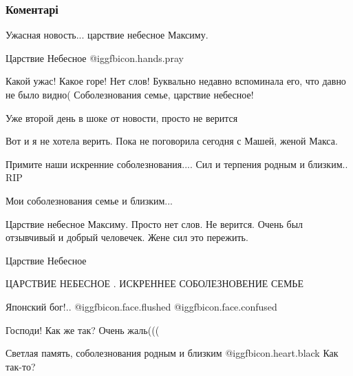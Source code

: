  
 
 
 
 
\subsubsection{Коментарі}
\label{sec:29_11_2021.fb.fb_group.vzaimovyruchka_doneck_dnr.1.maksim_sivuhin_smert.cmt}

\begin{itemize} %
Ужасная новость... царствие небесное Максиму.

Царствие Небесное  @igg{fbicon.hands.pray} 

Какой ужас! Какое горе! Нет слов!
Буквально недавно вспоминала его, что давно не было видно(
Соболезнования семье, царствие небесное!

Уже второй день в шоке от новости, просто не верится

Вот и я не хотела верить. Пока не поговорила сегодня с Машей, женой Макса.

Примите наши искренние соболезнования....
Сил и терпения родным и близким..
RIP

Мои соболезнования семье и близким...

Царствие небесное Максиму. Просто нет слов. Не верится. Очень был отзывчивый и добрый человечек. Жене сил это пережить.

Царствие Небесное

ЦАРСТВИЕ НЕБЕСНОЕ .
ИСКРЕННЕЕ СОБОЛЕЗНОВЕНИЕ СЕМЬЕ

Японский бог!..  @igg{fbicon.face.flushed}  @igg{fbicon.face.confused} 

Господи! Как же так? Очень жаль(((

Светлая память, соболезнования родным и близким  @igg{fbicon.heart.black} 
Как так-то?



\end{itemize}
